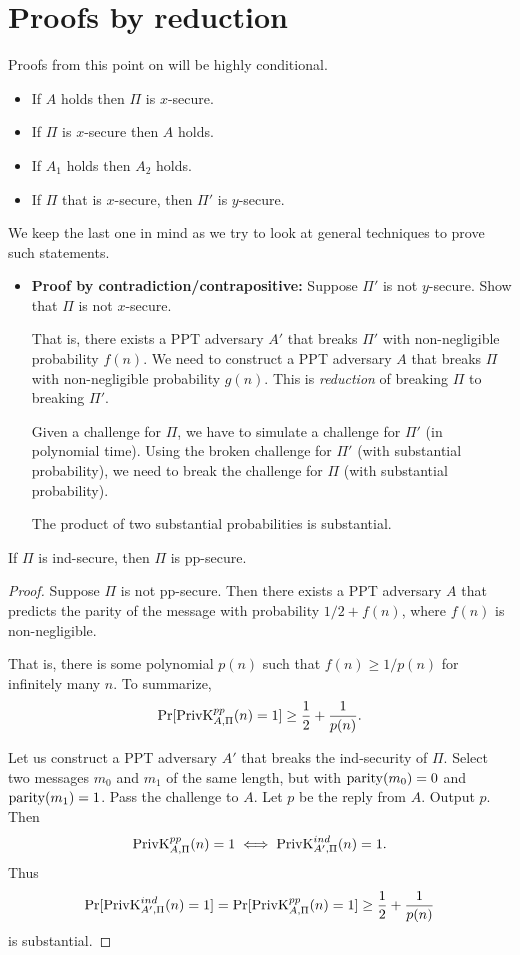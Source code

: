 \section{Proofs by reduction} \label{sec:reduction}
Proofs from this point on will be highly conditional.
\begin{itemize}
    \item If $A$ holds then $\Pi$ is $x$-secure.
    \item If $\Pi$ is $x$-secure then $A$ holds.
    \item If $A_1$ holds then $A_2$ holds.
    \item If $\Pi$ that is $x$-secure, then $\Pi'$ is $y$-secure.
\end{itemize}
We keep the last one in mind as we try to look at general techniques to
prove such statements.
\begin{itemize}
    \item \textbf{Proof by contradiction/contrapositive:}
    Suppose $\Pi'$ is not $y$-secure.
    Show that $\Pi$ is not $x$-secure.

    That is, there exists a PPT adversary $A'$ that breaks $\Pi'$ with
    non-negligible probability $f(n)$.
    We need to construct a PPT adversary $A$ that breaks $\Pi$ with
    non-negligible probability $g(n)$.
    This is \emph{reduction} of breaking $\Pi$ to breaking $\Pi'$.

    Given a challenge for $\Pi$, we have to simulate a challenge for $\Pi'$
    (in polynomial time).
    Using the broken challenge for $\Pi'$ (with substantial probability),
    we need to break the challenge for $\Pi$ (with substantial probability).

    The product of two substantial probabilities is substantial.
\end{itemize}

\begin{proposition}
    If $\Pi$ is ind-secure, then $\Pi$ is pp-secure.
\end{proposition}
\begin{proof}
    Suppose $\Pi$ is not pp-secure.
    Then there exists a PPT adversary $A$ that predicts the parity of the
    message with probability $1/2 + f(n)$, where $f(n)$ is non-negligible.

    That is, there is some polynomial $p(n)$ such that $f(n) \ge 1/p(n)$
    for infinitely many $n$.
    To summarize, \[
        \Pr[\operatorname{PrivK}^{pp}_{A, \Pi}(n) = 1] \ge \frac12 + \frac{1}{p(n)}.
    \]

    Let us construct a PPT adversary $A'$ that breaks the ind-security of
    $\Pi$.
    Select two messages $m_0$ and $m_1$ of the same length,
    but with $\operatorname{parity}(m_0) = 0$ and $\operatorname{parity}(m_1) = 1$.
    Pass the challenge to $A$.
    Let $p$ be the reply from $A$.
    Output $p$.
    Then \[
        \operatorname{PrivK}^{pp}_{A, \Pi}(n) = 1
        \iff
        \operatorname{PrivK}^{ind}_{A', \Pi}(n) = 1.
    \] Thus \[
        \Pr[\operatorname{PrivK}^{ind}_{A', \Pi}(n) = 1]
        = \Pr[\operatorname{PrivK}^{pp}_{A, \Pi}(n) = 1]
        \ge \frac12 + \frac{1}{p(n)}
    \] is substantial.
\end{proof}
